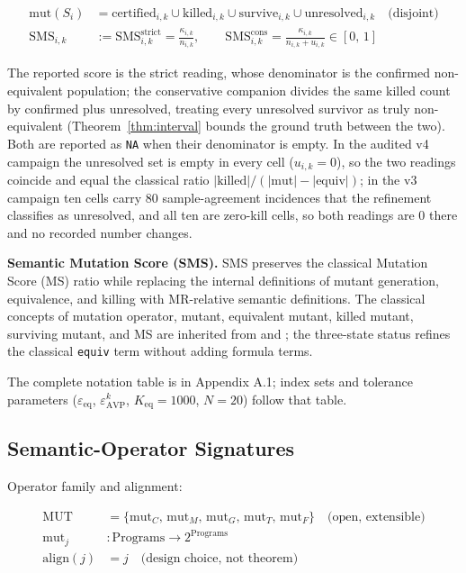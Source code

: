 \documentclass[manuscript,screen,review]{acmart}
\begin{document}
\begin{align*}
\mathrm{mut}(S_i) &= \mathrm{certified}_{i,k} \cup \mathrm{killed}_{i,k} \cup \mathrm{survive}_{i,k} \cup \mathrm{unresolved}_{i,k} \quad \text{(disjoint)} \\
\mathrm{SMS}_{i,k} &:= \mathrm{SMS}^{\mathrm{strict}}_{i,k} = \frac{\kappa_{i,k}}{n_{i,k}}, \qquad
\mathrm{SMS}^{\mathrm{cons}}_{i,k} = \frac{\kappa_{i,k}}{n_{i,k} + u_{i,k}} \in [0,\,1]
\end{align*}

The reported score is the strict reading, whose denominator is the
confirmed non-equivalent population; the conservative companion divides
the same killed count by confirmed plus unresolved, treating every
unresolved survivor as truly non-equivalent
(Theorem~\ref{thm:interval} bounds the ground truth between the two).
Both are reported as \texttt{NA} when their denominator is empty. In the
audited v4 campaign the unresolved set is empty in every cell
($u_{i,k} = 0$), so the two readings coincide and equal the classical
ratio $|\mathrm{killed}|/(|\mathrm{mut}| - |\mathrm{equiv}|)$; in the v3
campaign ten cells carry 80 sample-agreement incidences that the
refinement classifies as unresolved, and all ten are zero-kill cells, so
both readings are $0$ there and no recorded number changes.

\textbf{Semantic Mutation Score (SMS).} SMS preserves the classical
Mutation Score (MS) ratio while replacing the internal definitions of
mutant generation, equivalence, and killing with MR-relative semantic
definitions. The classical concepts of mutation operator, mutant,
equivalent mutant, killed mutant, surviving mutant, and MS are inherited
from \citet{d7c38286734419b52de4262c9802ebdfcf4b9447} and
\citet{ammann2008introduction}; the three-state status refines the
classical \texttt{equiv} term without adding formula terms.

The complete notation table is in Appendix A.1; index sets and tolerance
parameters ($\varepsilon_{\mathrm{eq}}$, $\varepsilon_{\mathrm{AVP}}^k$,
$K_{\mathrm{eq}} = 1000$, $N = 20$) follow that table.

\subsection{Semantic-Operator Signatures}\label{operator-signatures}

Operator family and alignment:

\begin{align*}
\mathrm{MUT} &= \{\mathrm{mut}_C,\, \mathrm{mut}_M,\, \mathrm{mut}_G,\, \mathrm{mut}_T,\, \mathrm{mut}_F\} \quad \text{(open, extensible)} \\
\mathrm{mut}_j &: \text{Programs} \to 2^{\text{Programs}} \\
\mathrm{align}(j) &= j \quad \text{(design choice, not theorem)}
\end{align*}
\end{document}
